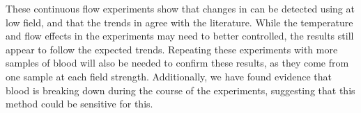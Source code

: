 These continuous flow experiments show that changes in \SOtwo can be detected using \Ttwo at low field, and that the trends in \Ttwo agree with the literature.
While the temperature and flow effects in the experiments may need to better controlled, the results still appear to follow the expected trends.
Repeating these experiments with more samples of blood will also be needed to confirm these results, as they come from one sample at each field strength.
Additionally, we have found evidence that blood is breaking down during the course of the experiments, suggesting that this \Ttwo method could be sensitive for this.
